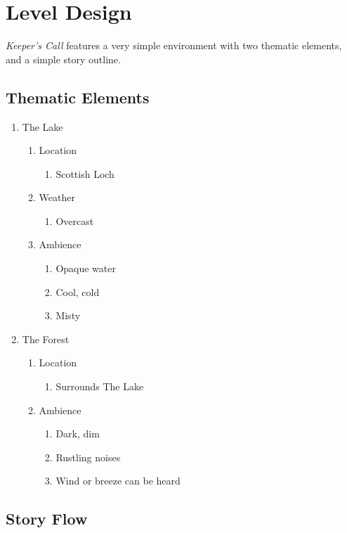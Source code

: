 \documentclass[letterpaper, twoside, 12pt]{memoir}
\begin{document}
\chapter{Level Design}

\textit{Keeper's Call} features a very simple environment with two thematic elements, and a simple story outline.

\section{Thematic Elements}

\begin{enumerate}
\item The Lake
  \begin{enumerate}
  \item Location
    \begin{enumerate}
    \item Scottish Loch
    \end{enumerate}
  \item Weather
    \begin{enumerate}
    \item Overcast
    \end{enumerate}
  \item Ambience
    \begin{enumerate}
    \item Opaque water
    \item Cool, cold
    \item Misty
    \end{enumerate}
  \end{enumerate}
\item The Forest
  \begin{enumerate}
  \item Location
    \begin{enumerate}
    \item Surrounds The Lake
    \end{enumerate}
  \item Ambience
    \begin{enumerate}
    \item Dark, dim
    \item Rustling noises
    \item Wind or breeze can be heard
    \end{enumerate}
  \end{enumerate}
\end{enumerate}

\section{Story Flow}
\end{document}
